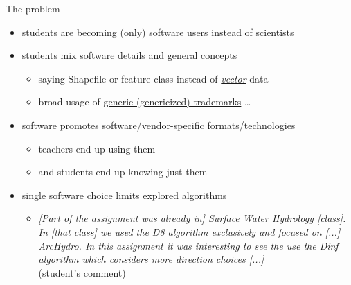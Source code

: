 \documentclass[xcolor={dvipsnames,usenames},beamer]{beamer}
\begin{document}
\begin{frame}{The problem}



\begin{itemize}
 \item students are becoming (only) software users instead of scientists
 \item students mix software details and general concepts
 \begin{itemize}
  \item saying Shapefile or feature class instead of
    \href{http://www.opengeospatial.org/ogc/glossary/v}{\emph{vector}} data
  \item broad usage of
    \href{https://en.wikipedia.org/wiki/Generic_trademark}{generic (genericized) trademarks}%
    \ldots
\end{itemize}
 \item software promotes software/vendor-specific formats/technologies
 \begin{itemize}
  \item teachers end up using them
  \item and students end up knowing just them
 \end{itemize}
 \item single software choice limits explored algorithms
 \begin{itemize}
  \item \color{gray}\emph{[Part of the assignment was already in] Surface Water Hydrology [class].
In [that class] we used the D8 algorithm exclusively and focused on [...] ArcHydro.
In this assignment it was interesting to see the use the Dinf
algorithm which considers more direction choices [...]} \\\scriptsize (student's comment)
 \end{itemize}

\end{itemize}

\end{frame}
\end{document}
